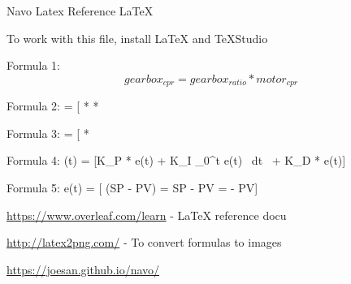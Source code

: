 \documentclass{article}
\begin{document}
Navo Latex Reference \LaTeX

To work with this file, install LaTeX and TeXStudio

Formula 1:
\[ gearbox_{cpr} = gearbox_{ratio} * motor_{cpr} \]

Formula 2:
\rpm = [ *  * \]

Formula 3:
\rpm = [ * \]

Formula 4:
\output(t) = [K_{P} * e(t) + K_{I} \int\limits_0^t e(t) \ dt \ + K_{D} *  e(t)]

Formula 5:
 e(t) = [ (SP - PV) =  SP -  PV = -  PV]

\url{https://www.overleaf.com/learn} - LaTeX reference docu

\url{http://latex2png.com/} - To convert formulas to images

\url{https://joesan.github.io/navo/}
\end{document}
